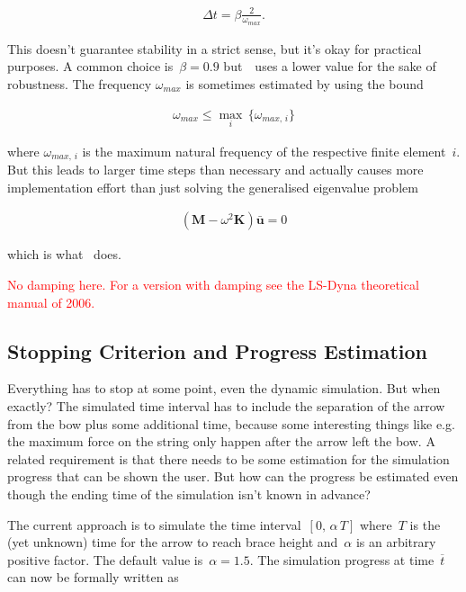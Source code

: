 \begin{align}
\Delta t = \beta \frac{2}{\omega_{max}}.
\end{align}

This doesn't guarantee stability in a strict sense, but it's okay for practical purposes. A common choice is~$\beta = 0.9$ but~\swtitle\ uses a lower value for the sake of robustness. The frequency $\omega_{max}$ is sometimes estimated by using the bound

\begin{align}
\omega_{max} \le \max_{i}\,\{\omega_{max,\,i}\}
\end{align}

where $\omega_{max,\,i}$ is the maximum natural frequency of the respective finite element~$i$. But this leads to larger time steps than necessary and actually causes more implementation effort than just solving the generalised eigenvalue problem

\begin{align}
\left(\boldsymbol{M} - \omega^2\boldsymbol{K}\right)\boldsymbol{\bar{u}} = 0\label{eq:natural_frequencies}
\end{align}

which is what \swtitle\ does.

\textcolor{red}{No damping here. For a version with damping see the LS-Dyna theoretical manual of 2006.}

\subsection{Stopping Criterion and Progress Estimation}

Everything has to stop at some point, even the dynamic simulation. But when exactly?
The simulated time interval has to include the separation of the arrow from the bow plus some additional time, because some interesting things like e.g. the maximum force on the string only happen after the arrow left the bow.
A related requirement is that there needs to be some estimation for the simulation progress that can be shown the user.
But how can the progress be estimated even though the ending time of the simulation isn't known in advance?

The current approach is to simulate the time interval~$[0,\,\alpha\,T]$ where~$T$ is the (yet unknown) time for the arrow to reach brace height and~$\alpha$ is an arbitrary positive factor.
The default value is~$\alpha = 1.5$. The simulation progress at time~$\overline{t}$ can now be formally written as

